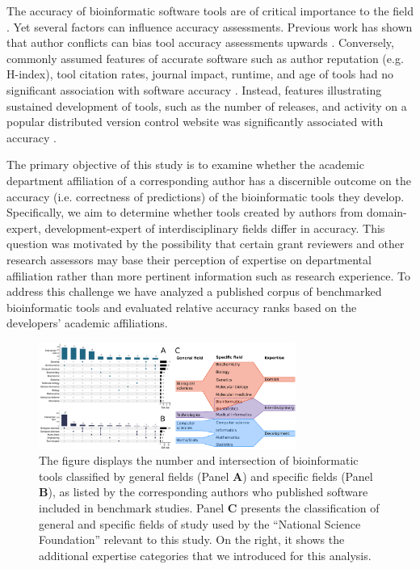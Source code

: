 \documentclass[fleqn,10pt,doc,onecolumn]{SelfArx}%
\begin{document}
\textcolor{rv}{The accuracy of bioinformatic software tools are of
  critical importance to the field \cite{weber2019essential}. Yet
  several factors can influence accuracy assessments. Previous work
  has shown that author conflicts can bias tool accuracy assessments
  upwards \cite{buchka2021optimistic}. Conversely, commonly assumed
  features of accurate software such as author reputation
  (e.g. H-index), tool citation rates, journal impact, runtime, and
  age of tools had no significant association with software accuracy
  \cite{Gardner:2022}.  Instead, features illustrating sustained
  development of tools, such as the number of releases, and activity
  on a popular distributed version control website was significantly
  associated with accuracy \cite{Gardner:2022}.}

The primary objective of this study is to examine whether the academic
department affiliation of a corresponding author has a discernible
outcome on the accuracy (i.e. correctness of predictions) of the
bioinformatic tools they develop. Specifically, we aim to determine
whether tools created by authors from domain-expert,
development-expert of interdisciplinary fields differ in accuracy.
\textcolor{rv}{This question was motivated by the possibility
  that certain grant reviewers and other research assessors may base
  their perception of expertise on departmental affiliation rather
  than more pertinent information such as research experience.} To
address this challenge we have analyzed a published corpus of
benchmarked bioinformatic tools and evaluated relative accuracy ranks
based on the developers' academic affiliations.


\begin{figure}[t!]
  \centering
  \includegraphics[width=0.75\textwidth]{figure1.pdf}
  \caption{ \textcolor{rv}{ The figure displays the number and
      intersection of bioinformatic tools classified by general fields (Panel \textbf{A})
      and specific fields (Panel \textbf{B}), as listed by the corresponding
      authors who published software included in benchmark
      studies. Panel \textbf{C} presents the classification of general and
      specific fields of study used by the ``National Science Foundation''
      relevant to this study. On the right, it shows the additional
      expertise categories that we introduced for this analysis.
 }  }
\label{fig:fig1}
\end{figure}
\end{document}
